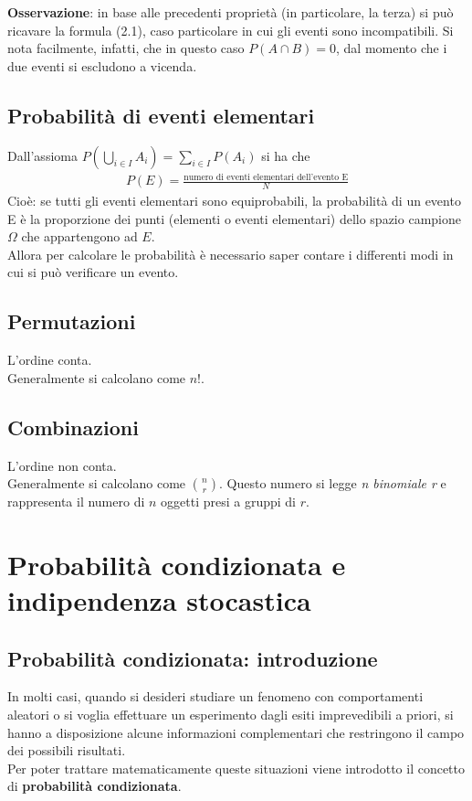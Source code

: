\textbf{Osservazione}: in base alle precedenti proprietà (in particolare, la terza) si può ricavare la formula (2.1), caso particolare in cui gli eventi sono incompatibili. Si nota facilmente, infatti, che in questo caso $P(A \cap B) = 0$, dal momento che i due eventi si escludono a vicenda.

\subsection{Probabilità di eventi elementari}
Dall'assioma $P(\bigcup_{i \in I} A_i) = \sum_{i \in I} P(A_i)$ si ha che 
\begin{align}
	P(E) = \frac{\text{numero di eventi elementari dell'evento E}}{N}
\end{align}
Cioè: se tutti gli eventi elementari sono equiprobabili, la probabilità di un evento E è la proporzione dei punti (elementi o eventi elementari) dello spazio campione $\Omega$ che appartengono ad $E$. \\
Allora per calcolare le probabilità è necessario saper contare i differenti modi in cui si può verificare un evento.

\subsection{Permutazioni}
L'ordine conta. \\
Generalmente si calcolano come $n!$.

\subsection{Combinazioni}
L'ordine non conta. \\
Generalmente si calcolano come $\binom{n}{r}$. Questo numero si legge \textit{n binomiale r} e rappresenta il numero di $n$ oggetti presi a gruppi di $r$.

\section{Probabilità condizionata e indipendenza stocastica}
\subsection{Probabilità condizionata: introduzione}
In molti casi, quando si desideri studiare un fenomeno con comportamenti aleatori o si voglia effettuare un esperimento dagli esiti imprevedibili a priori, si hanno a disposizione alcune informazioni complementari che restringono il campo dei possibili risultati.\\
Per poter trattare matematicamente queste situazioni viene introdotto il concetto di
\textbf{probabilità condizionata}.

